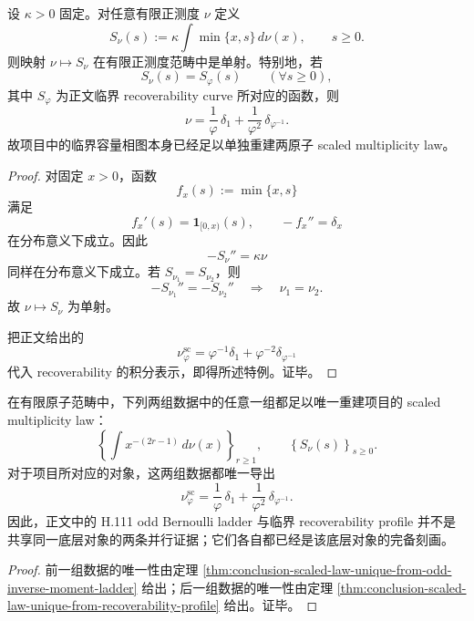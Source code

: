 \begin{theorem}\label{thm:conclusion-scaled-law-unique-from-recoverability-profile}
设 \(\kappa>0\) 固定。对任意有限正测度 \(\nu\) 定义
\[
S_\nu(s):=\kappa\int \min\{x,s\}\,d\nu(x),
\qquad
s\ge 0.
\]
则映射 \(\nu\mapsto S_\nu\) 在有限正测度范畴中是单射。特别地，若
\[
S_\nu(s)=S_\varphi(s)
\qquad (\forall s\ge 0),
\]
其中 \(S_\varphi\) 为正文临界 recoverability curve 所对应的函数，则
\[
\nu=\frac1\varphi\,\delta_1+\frac1{\varphi^2}\,\delta_{\varphi^{-1}}.
\]
故项目中的临界容量相图本身已经足以单独重建两原子 scaled multiplicity law。
\end{theorem}
\begin{proof}
对固定 \(x>0\)，函数
\[
f_x(s):=\min\{x,s\}
\]
满足
\[
f_x'(s)=\mathbf 1_{[0,x)}(s),
\qquad
-f_x''=\delta_x
\]
在分布意义下成立。因此
\[
-S_\nu''=\kappa\nu
\]
同样在分布意义下成立。若 \(S_{\nu_1}=S_{\nu_2}\)，则
\[
-S_{\nu_1}''=-S_{\nu_2}''
\quad\Longrightarrow\quad
\nu_1=\nu_2.
\]
故 \(\nu\mapsto S_\nu\) 为单射。

把正文给出的
\[
\nu_\varphi^{\mathrm{sc}}
=
\varphi^{-1}\delta_1+\varphi^{-2}\delta_{\varphi^{-1}}
\]
代入 recoverability 的积分表示，即得所述特例。证毕。
\end{proof}

\begin{corollary}\label{cor:conclusion-scaled-law-two-chains-mutually-determining}
在有限原子范畴中，下列两组数据中的任意一组都足以唯一重建项目的 scaled multiplicity law：
\[
\left\{
\int x^{-(2r-1)}\,d\nu(x)
\right\}_{r\ge 1},
\qquad
\left\{
S_\nu(s)
\right\}_{s\ge 0}.
\]
对于项目所对应的对象，这两组数据都唯一导出
\[
\nu_\varphi^{\mathrm{sc}}
=
\frac1\varphi\,\delta_1+\frac1{\varphi^2}\,\delta_{\varphi^{-1}}.
\]
因此，正文中的 H.111 odd Bernoulli ladder 与临界 recoverability profile 并不是共享同一底层对象的两条并行证据；它们各自都已经是该底层对象的完备刻画。
\end{corollary}
\begin{proof}
前一组数据的唯一性由定理 \ref{thm:conclusion-scaled-law-unique-from-odd-inverse-moment-ladder} 给出；后一组数据的唯一性由定理 \ref{thm:conclusion-scaled-law-unique-from-recoverability-profile} 给出。证毕。
\end{proof}



